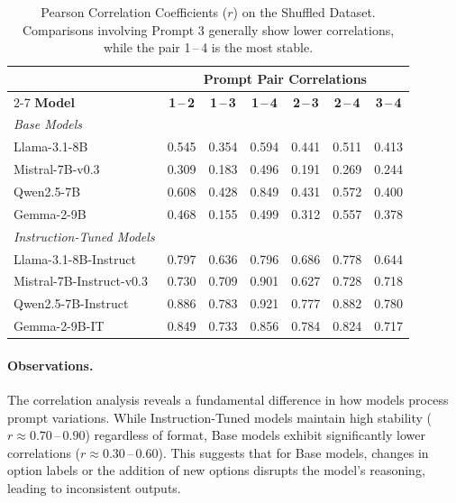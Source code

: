 \begin{table}[H]
    \centering
    \small
    \caption{Pearson Correlation Coefficients ($r$) on the Shuffled Dataset. Comparisons involving Prompt 3 generally show lower correlations, while the pair 1\,--\,4 is the most stable.}
    \label{tab:corr_shuffled}
    \begin{tabular}{lcccccc}
        \toprule
        & \multicolumn{6}{c}{\textbf{Prompt Pair Correlations}} \\
        \cmidrule(lr){2-7}
        \textbf{Model} & \textbf{1\,--\,2} & \textbf{1\,--\,3} & \textbf{1\,--\,4} & \textbf{2\,--\,3} & \textbf{2\,--\,4} & \textbf{3\,--\,4} \\
        \midrule
        \textit{Base Models} & & & & & & \\
        Llama-3.1-8B & 0.545 & 0.354 & 0.594 & 0.441 & 0.511 & 0.413 \\
        Mistral-7B-v0.3 & 0.309 & 0.183 & 0.496 & 0.191 & 0.269 & 0.244 \\
        Qwen2.5-7B & 0.608 & 0.428 & 0.849 & 0.431 & 0.572 & 0.400 \\
        Gemma-2-9B & 0.468 & 0.155 & 0.499 & 0.312 & 0.557 & 0.378 \\
        \midrule
        \textit{Instruction-Tuned Models} & & & & & & \\
        Llama-3.1-8B-Instruct & 0.797 & 0.636 & 0.796 & 0.686 & 0.778 & 0.644 \\
        Mistral-7B-Instruct-v0.3 & 0.730 & 0.709 & 0.901 & 0.627 & 0.728 & 0.718 \\
        Qwen2.5-7B-Instruct & 0.886 & 0.783 & 0.921 & 0.777 & 0.882 & 0.780 \\
        Gemma-2-9B-IT & 0.849 & 0.733 & 0.856 & 0.784 & 0.824 & 0.717 \\
        \bottomrule
    \end{tabular}
\end{table}

\paragraph{Observations.}
The correlation analysis reveals a fundamental difference in how models process prompt variations. While Instruction-Tuned models maintain high stability ($r \approx 0.70$\,--\,$0.90$) regardless of format, Base models exhibit significantly lower correlations ($r \approx 0.30$\,--\,$0.60$). This suggests that for Base models, changes in option labels or the addition of new options disrupts the model's reasoning, leading to inconsistent outputs.

